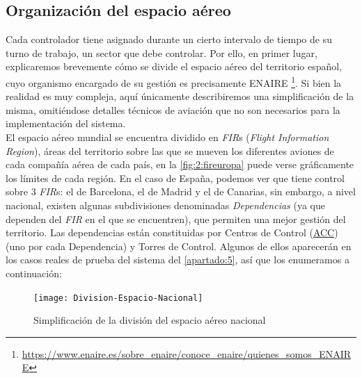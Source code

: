 \subsection{Organización del espacio aéreo}
\label{section:2:sectores-y-sectorizacion}
Cada controlador tiene asignado durante un cierto intervalo de tiempo de su turno de trabajo, un sector que debe controlar.
Por ello, en primer lugar, explicaremos brevemente cómo se divide el espacio aéreo del territorio español, cuyo organismo
encargado de su gestión es precisamente ENAIRE
\footnote{\url{https://www.enaire.es/sobre_enaire/conoce_enaire/quienes_somos_ENAIRE}}.
Si bien la realidad es muy compleja, aquí únicamente describiremos una simplificación de la misma, omitiéndose
detalles técnicos de aviación que no son necesarios para la implementación del sistema.
\\

El espacio aéreo mundial se encuentra dividido en \textit{FIR}s (\textit{Flight Information Region}), áreas del
territorio sobre las que se mueven los diferentes aviones de cada compañía aérea de cada país, en la
\autoref{fig:2:fireuropa} puede verse gráficamente los límites de cada región. En el caso de España,
podemos ver que tiene control sobre 3 \textit{FIR}s: el de Barcelona, el de Madrid y el de Canarias, sin embargo,
a nivel nacional, existen algunas subdivisiones denominadas \textit{Dependencias} (ya que dependen del \textit{FIR}
en el que se encuentren), que permiten una mejor gestión del territorio. Las dependencias están constituidas por Centros de Control (\hyperref[ACC]{ACC}) (uno por cada Dependencia) y Torres de Control. Algunos de ellos aparecerán en los casos reales de prueba del sistema del \autoref{apartado:5}, así que los enumeramos a continuación:

\begin{figure}[htbp]
    \centering
    \texttt{[image: Division-Espacio-Nacional]}
    \caption{Simplificación de la división del espacio aéreo nacional}
    \label{fig:2:regiones}
\end{figure}

